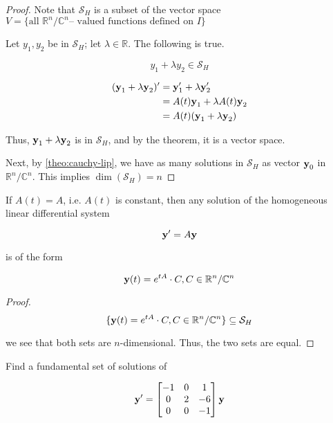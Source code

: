 	\begin{proof}
		Note that $\mathcal{S}_H$ is a subset of the vector space $V = \{\text{all }\mathbb{R}^n / \mathbb{C}^n \text{-- valued functions defined on } I\}$

		Let $y_1, y_2$ be in $\mathcal{S}_H$; let $\lambda \in \mathbb{R}$. The following is true.

		\[y_1 + \lambda y_2 \in \mathcal{S}_H\]

		\begin{align*}
			(\bm{\mathrm{y}}_1 + \lambda\bm{\mathrm{y}}_2)' &= \bm{\mathrm{y}}_1' + \lambda\bm{\mathrm{y}}_2'\\
			&= A(t) \bm{\mathrm{y}}_1 + \lambda A(t) \bm{\mathrm{y}}_2\\
			&= A(t) (\bm{\mathrm{y}}_1 + \lambda \bm{\mathrm{y}}_2)
		\end{align*}

		Thus, $\bm{\mathrm{y}}_1 + \lambda \bm{\mathrm{y}}_2$ is in $\mathcal{S}_H$, and by the theorem, it is a vector space.
		
		Next, by \cref*{theo:cauchy-lip}, we have as many solutions in $\mathcal{S}_H$ as vector $\bm{\mathrm{y}}_0$ in $\mathbb{R}^n / \mathbb{C}^n$. This implies $\dim(\mathcal{S}_H) = n$
	\end{proof}

	\begin{theorem}
		\label{theo:homoform}
		If $A(t) = A$, i.e. $A(t)$ is constant, then any solution of the homogeneous linear differential system

		\[\bm{\mathrm{y}}' = A\bm{\mathrm{y}}\]

		is of the form

		\[\bm{\mathrm{y}}(t) = e^{tA} \cdot C, C \in \mathbb{R}^n / \mathbb{C}^n\]
	\end{theorem}

	\begin{proof}
		\[\{\bm{\mathrm{y}}(t) = e^{tA} \cdot C, C\in \mathbb{R}^n / \mathbb{C}^n\} \subseteq \mathcal{S}_H\]

		we see that both sets are $n$-dimensional. Thus, the two sets are equal.
	\end{proof}

	\begin{example}
		Find a fundamental set of solutions of

		\[\bm{\mathrm{y}}' = \begin{bmatrix}
			-1&0&1\\0&2&-6\\0&0&-1
		\end{bmatrix}\bm{\mathrm{y}}\]
	\end{example}

